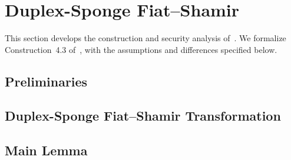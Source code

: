 \section{Duplex-Sponge Fiat--Shamir}
\label{sec:fiat_shamir_from_duplex_sponges}

This section develops the construction and security analysis of~\cite{CO25}.
We formalize Construction~4.3 of~\cite{CO25}, with the assumptions and differences specified below.

\begingroup
\renewcommand{\Witness}{\mathsf{w}}

\subsection{Preliminaries}


\subsection{Duplex-Sponge Fiat--Shamir Transformation}
\label{sec:dsfs_duplex_sponge_fs}


\subsection{Main Lemma}


\endgroup
